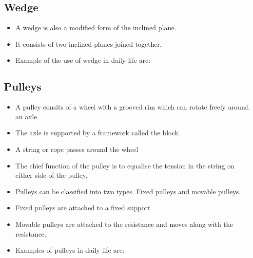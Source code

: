 \documentclass[12pt]{book}
\begin{document}
\subsection*{Wedge}
\begin{itemize}
    \item A wedge is also a modified form of the inclined plane.
    \item It consists of two inclined planes joined together.
    \item Example of the use of wedge in daily life are:
\end{itemize}
\subsection*{Pulleys}
\begin{itemize}
    \item A pulley consits of a wheel with a grooved rim which can rotate freely around an axle.
    \item The axle is supported by a framework called the block.
    \item A string or rope passes around the wheel
    \item The chief function of the pulley is to equalise the tension in the string on either side of the pulley.
    \item Pulleys can be classified into two types. Fixed pulleys and movable pulleys.
    \item Fixed pulleys are attached to a fixed support
    \item Movable pulleys are attached to the resistance and moves along with the resistance.
    \item Examples of pulleys in daily life are:
\end{itemize}


\end{document}
